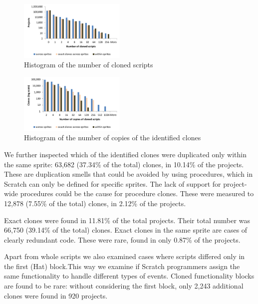 \documentclass{sig-alternate}
\begin{document}
\begin{figure}
	\centering
	\includegraphics[width=0.45\textwidth]{fig/charts/11clonesprojects}
	\caption{Histogram of the number of cloned scripts}
	\label{fig:clonesprojects}
\end{figure}

\begin{figure}
	\centering
	\includegraphics[width=0.45\textwidth]{fig/charts/11clonescopies}
	\caption{Histogram of the number of copies of the identified clones}
	\label{fig:clonescopies}
\end{figure}

We further inspected which of the identified clones were duplicated only within the same sprite: 63,682 (37.34\% of the total) clones, in 10.14\% of the projects. These are duplication smells that could be avoided by using procedures, which in Scratch can only be defined for specific sprites. The lack of support for project-wide procedures could be the cause for procedure clones. These were measured to 12,878 (7.55\% of the total) clones, in 2.12\% of the projects.

Exact clones were found in 11.81\% of the total projects. Their total number was 66,750 (39.14\% of the total) clones. Exact clones in the same sprite are cases of clearly redundant code. These were rare, found in only 0.87\% of the projects.

Apart from whole scripts we also examined cases where scripts differed only in the first (Hat) block.This way we examine if Scratch programmers assign the same functionality to handle different types of events. Cloned functionality blocks are found to be rare: without considering the first block, only 2,243 additional clones were found in 920 projects.
\end{document}
